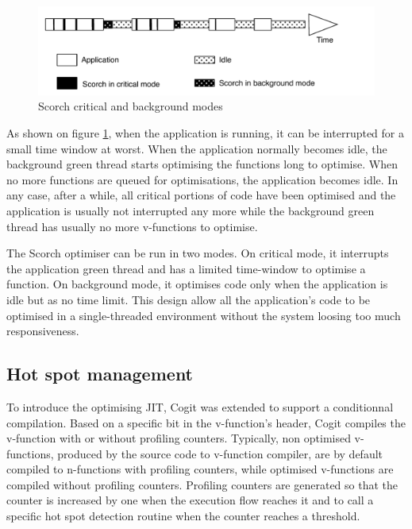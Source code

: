 \documentclass[a4paper,12pt,twoside]{../includes/ThesisStyle}
\begin{document}
\begin{figure}[h!]
    \begin{center}
        \includegraphics[width=0.9\linewidth]{ScorchModes}
        \caption{Scorch critical and background modes}
        \label{fig:ScorchModes}
    \end{center}
\end{figure}

As shown on figure \ref{fig:ScorchModes}, when the application is running, it can be interrupted for a small time window at worst. When the application normally becomes idle, the background green thread starts optimising the functions long to optimise. When no more functions are queued for optimisations, the application becomes idle. In any case, after a while, all critical portions of code have been optimised and the application is usually not interrupted any more while the background green thread has usually no more v-functions to optimise.

The Scorch optimiser can be run in two modes. On critical mode, it interrupts the application green thread and has a limited time-window to optimise a function. On background mode, it optimises code only when the application is idle but as no time limit. This design allow all the application's code to be optimised in a single-threaded environment without the system loosing too much responsiveness.

\subsection{Hot spot management}

To introduce the optimising JIT, Cogit was extended to support a conditionnal compilation. Based on a specific bit in the v-function's header, Cogit compiles the v-function with or without profiling counters. Typically, non optimised v-functions, produced by the source code to v-function compiler, are by default compiled to n-functions with profiling counters, while optimised v-functions are compiled without profiling counters. Profiling counters are generated so that the counter is increased by one when the execution flow reaches it and to call a specific hot spot detection routine when the counter reaches a threshold.
\end{document}
